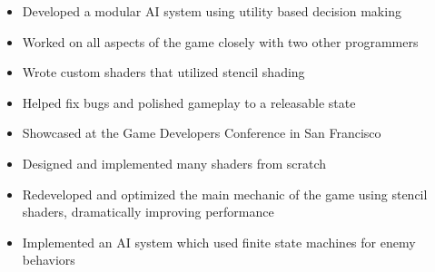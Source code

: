 \documentclass[10pt,a4paper]{altacv}
\begin{document}

\begin{itemize}
	
	\item Developed a modular AI system using utility based decision making
	\item Worked on all aspects of the game closely with two other programmers
	\item Wrote custom shaders that utilized stencil shading
	\item Helped fix bugs and polished gameplay to a releasable state
	\item Showcased at the Game Developers Conference in San Francisco
\end{itemize}

\divider

\begin{itemize}
	
	\item Designed and implemented many shaders from scratch
	\item Redeveloped and optimized the main mechanic of the game using stencil shaders, dramatically improving performance
	\item Implemented an AI system which used finite state machines for enemy behaviors
\end{itemize}



\nocite{*}








\end{document}
